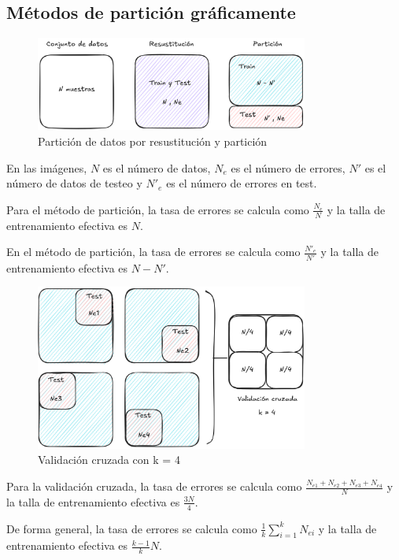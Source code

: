 \subsection{Métodos de partición gráficamente}

\begin{figure}[H]
    \centering
    \includegraphics[width=0.8\textwidth]{images/particion.png}
    \caption{Partición de datos por resustitución y partición}
    \label{fig:particion_datos}
\end{figure}

En las imágenes, $N$ es el número de datos, $N_e$ es el número de errores,
$N'$ es el número de datos de testeo y $N'_e$ es el número de errores en test.

Para el método de partición, la tasa de errores se calcula como $\frac{N_e}{N}$
y la talla de entrenamiento efectiva es $N$.

En el método de partición, la tasa de errores se calcula como $\frac{N'_e}{N'}$
y la talla de entrenamiento efectiva es $N - N'$.

\begin{figure}[H]
    \centering
    \includegraphics[width=0.8\textwidth]{images/cross_val.png}
    \caption{Validación cruzada con k = 4}
    \label{fig:cross_validation}
\end{figure}

Para la validación cruzada, la tasa de errores se calcula como
$\frac{N_{e1} + N_{e2} + N_{e3} + N_{e4}}{N}$ y la talla de entrenamiento
efectiva es $\frac{3N}{4}$.

De forma general, la tasa de errores se calcula como
$\frac{1}{k} \sum_{i=1}^{k} N_{ei}$ y la talla de entrenamiento efectiva es
$\frac{k-1}{k} N$.